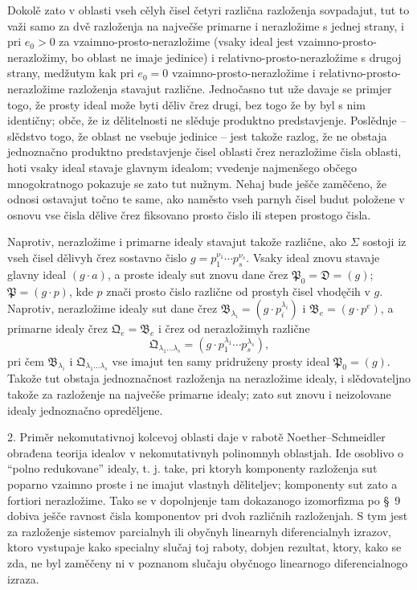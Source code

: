 \documentclass[11pt]{article}
\newcommand{\ideal}[1]{\mathfrak{#1}}
\begin{document}
Dokolě zato v oblasti vseh cělyh čisel četyri različna razloženja sovpadajut, tut to važi samo za dvě razloženja na največše primarne i nerazložime s jednej strany, i pri \(e_0>0\) za vzaimno-prosto-nerazložime (vsaky ideal jest vzaimno-prosto-nerazložimy, bo oblast ne imaje jedinice) i relativno-prosto-nerazložime s drugoj strany, medžutym kak pri \(e_0=0\) vzaimno-prosto-nerazložime i relativno-prosto-nerazložime razloženja stavajut različne. Jednočasno tut uže davaje se primjer togo, že prosty ideal može byti děliv črez drugi, bez togo že by byl s nim identičny; obče, že iz dělitelnosti ne slěduje produktno predstavjenje. Poslědnje -- slědstvo togo, že oblast ne vsebuje jedinice -- jest takože razlog, že ne obstaja jednoznačno produktno predstavjenje čisel oblasti črez nerazložime čisla oblasti, hoti vsaky ideal stavaje glavnym idealom; vvedenje najmenšego občego mnogokratnogo pokazuje se zato tut nužnym. Nehaj bude ješče zaměčeno, že odnosi ostavajut točno te same, ako naměsto vseh parnyh čisel budut položene v osnovu vse čisla dělive črez fiksovano prosto čislo ili stepen prostogo čisla.

Naprotiv, nerazložime i primarne idealy stavajut takože različne, ako \(\Sigma\) sostoji iz vseh čisel dělivyh črez sostavno čislo \(g=p_1^{\nu_1}\cdots p_s^{\nu_s}\). Vsaky ideal znovu stavaje glavny ideal \((g\cdot a)\), a proste idealy sut znovu dane črez \(\ideal P_0=\ideal D=(g)\); \(\ideal P=(g\cdot p)\), kde \(p\) znači prosto čislo različne od prostyh čisel vhodęčih v \(g\). Naprotiv, nerazložime idealy sut dane črez \(\ideal B_{\lambda_i}=(g\cdot p_i^{\lambda_i})\) i \(\ideal B_e=(g\cdot p^e)\), a primarne idealy črez \(\ideal Q_e=\ideal B_e\) i črez od nerazložimyh različne
\[
 \ideal Q_{\lambda_1\ldots\lambda_s}=(g\cdot p_1^{\lambda_1}\cdots p_s^{\lambda_s}),
\]
pri čem \(\ideal B_{\lambda_i}\) i \(\ideal Q_{\lambda_1\ldots\lambda_s}\) vse imajut ten samy pridruženy prosty ideal \(\ideal P_0=(g)\). Takože tut obstaja jednoznačnost razloženja na nerazložime idealy, i slědovateljno takože za razloženje na največše primarne idealy; zato sut znovu i neizolovane idealy jednoznačno opreděljene.

2. Priměr nekomutativnoj kolcevoj oblasti daje v rabotě Noether--Schmeidler obrađena teorija idealov v nekomutativnyh polinomnyh oblastjah. Ide osoblivo o ``polno redukovane'' idealy, t. j. take, pri ktoryh komponenty razloženja sut poparno vzaimno proste i ne imajut vlastnyh děliteljev; komponenty sut zato a fortiori nerazložime. Tako se v dopolnjenje tam dokazanogo izomorfizma po \S~9 dobiva ješče ravnost čisla komponentov pri dvoh različnih razloženjah. S tym jest za razloženje sistemov parcialnyh ili obyčnyh linearnyh diferencialnyh izrazov, ktoro vystupaje kako specialny slučaj toj raboty, dobjen rezultat, ktory, kako se zda, ne byl zaměčeny ni v poznanom slučaju obyčnogo linearnogo diferencialnogo izraza.
\end{document}

